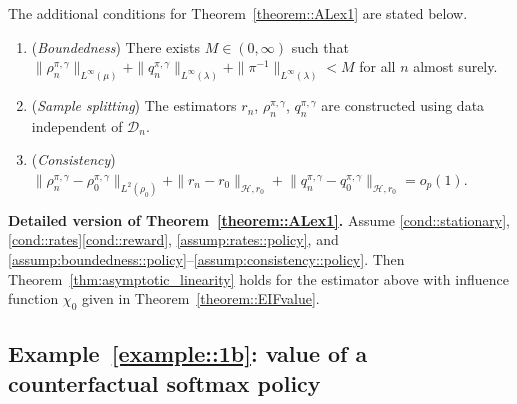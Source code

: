 \documentclass[11pt]{article}
\theoremstyle{plain}
\begin{document}
The additional conditions for Theorem~\ref{theorem::ALex1} are stated below.
\begin{enumerate}[label=\textbf{(E\arabic*)}, ref=E\arabic*, resume = efficiency1a]
    \item \label{assump:boundedness::policy}(\textit{Boundedness})
    There exists $M \in (0,\infty)$ such that
    $\|\rho_n^{\pi,\gamma}\|_{L^\infty(\mu)}
      + \|q_n^{\pi,\gamma}\|_{L^\infty(\lambda)}
      + \|\pi^{-1}\|_{L^\infty(\lambda)} < M$
    for all $n$ almost surely.

    \item \label{assump:splitting::policy}(\textit{Sample splitting})
    The estimators $r_n$, $\rho_n^{\pi,\gamma}$, $q_n^{\pi,\gamma}$ are constructed using data independent of $\mathcal{D}_n$.

    \item \label{assump:consistency::policy}(\textit{Consistency})
   $ \|\rho_n^{\pi,\gamma} - \rho_0^{\pi,\gamma}\|_{L^2(\rho_0)}
      + \|r_n - r_0\|_{\mathcal{H},r_0} +
    \bigl\|
        q_n^{\pi,\gamma} - q_0^{\pi,\gamma}
    \bigr\|_{\mathcal{H},r_0}
    = o_p(1)$.
\end{enumerate}

\medskip\noindent\textbf{Detailed version of Theorem~\ref{theorem::ALex1}.}
Assume \ref{cond::stationary}, \ref{cond::rates}\ref{cond::reward},
\ref{assump:rates::policy}, and
\ref{assump:boundedness::policy}--\ref{assump:consistency::policy}. Then
Theorem~\ref{thm:asymptotic_linearity} holds for the estimator above with
influence function \(\chi_0\) given in Theorem~\ref{theorem::EIFvalue}.

\subsection{Example~\ref{example::1b}: value of a counterfactual softmax policy}
\end{document}
